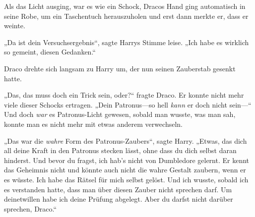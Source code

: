 Als das Licht ausging, war es wie ein Schock, Dracos Hand ging automatisch in seine Robe, um ein Taschentuch herauszuholen und erst dann merkte er, dass er weinte.

„Da ist dein Versuchsergebnis“, sagte Harrys Stimme leise. „Ich habe es wirklich so gemeint, diesen Gedanken.“

Draco drehte sich langsam zu Harry um, der nun seinen Zauberstab gesenkt hatte.

„Das, das muss doch ein Trick sein, oder?“ fragte Draco. Er konnte nicht mehr viele dieser Schocks ertragen. „Dein Patronus—so hell \emph{kann} er doch nicht sein—“ Und doch \emph{war} es Patronus-Licht gewesen, sobald man wusste, was man sah, konnte man es nicht mehr mit etwas anderem verwechseln.

„Das war die \emph{wahre} Form des Patronus-Zaubers“, sagte Harry. „Etwas, das dich all deine Kraft in den Patronus stecken lässt, ohne dass du dich selbst daran hinderst. Und bevor du fragst, ich hab’s nicht von Dumbledore gelernt. Er kennt das Geheimnis nicht und könnte auch nicht die wahre Gestalt zaubern, wenn er es wüsste. Ich habe das Rätsel für mich selbst gelöst. Und ich wusste, sobald ich es verstanden hatte, dass man über diesen Zauber nicht sprechen darf. Um deinetwillen habe ich deine Prüfung abgelegt. Aber du darfst nicht darüber sprechen, Draco.“


